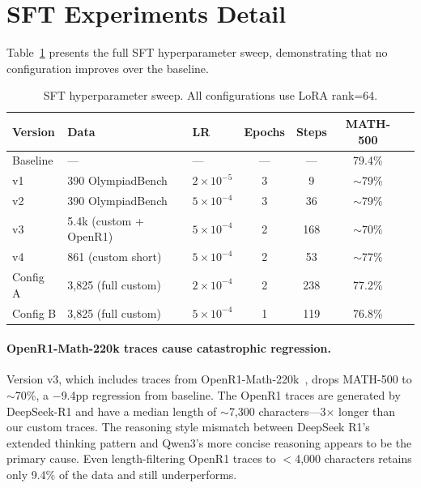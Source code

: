 \documentclass[11pt,a4paper]{article}
\begin{document}
\section{SFT Experiments Detail}
\label{sec:sft-detail}

Table~\ref{tab:sft-sweep} presents the full SFT hyperparameter sweep, demonstrating that no configuration improves over the baseline.

\begin{table}[H]
\centering
\caption{SFT hyperparameter sweep. All configurations use LoRA rank=64.}
\label{tab:sft-sweep}
\small
\begin{tabular}{lllcccc}
\toprule
\textbf{Version} & \textbf{Data} & \textbf{LR} & \textbf{Epochs} & \textbf{Steps} & \textbf{MATH-500} \\
\midrule
Baseline & --- & --- & --- & --- & 79.4\% \\
\midrule
v1 & 390 OlympiadBench & $2\times10^{-5}$ & 3 & 9 & $\sim$79\% \\
v2 & 390 OlympiadBench & $5\times10^{-4}$ & 3 & 36 & $\sim$79\% \\
v3 & 5.4k (custom + OpenR1) & $5\times10^{-4}$ & 2 & 168 & $\sim$70\% \\
v4 & 861 (custom short) & $5\times10^{-4}$ & 2 & 53 & $\sim$77\% \\
Config A & 3,825 (full custom) & $2\times10^{-4}$ & 2 & 238 & 77.2\% \\
Config B & 3,825 (full custom) & $5\times10^{-4}$ & 1 & 119 & 76.8\% \\
\bottomrule
\end{tabular}
\end{table}

\paragraph{OpenR1-Math-220k traces cause catastrophic regression.} Version v3, which includes traces from OpenR1-Math-220k~\citep{openr1}, drops MATH-500 to $\sim$70\%, a $-$9.4pp regression from baseline. The OpenR1 traces are generated by DeepSeek-R1 and have a median length of $\sim$7,300 characters---3$\times$ longer than our custom traces. The reasoning style mismatch between DeepSeek R1's extended thinking pattern and Qwen3's more concise reasoning appears to be the primary cause. Even length-filtering OpenR1 traces to $<$4,000 characters retains only 9.4\% of the data and still underperforms.
\end{document}
